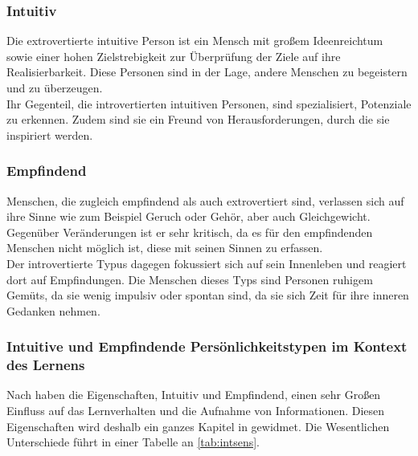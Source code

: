 \subsubsection{Intuitiv}
Die extrovertierte intuitive Person ist ein Mensch mit großem Ideenreichtum sowie einer hohen Zielstrebigkeit zur Überprüfung der Ziele auf ihre Realisierbarkeit. Diese Personen sind in der Lage, andere Menschen zu begeistern und zu überzeugen.\\
Ihr Gegenteil, die introvertierten intuitiven Personen, sind spezialisiert, Potenziale zu erkennen. Zudem sind sie ein Freund von Herausforderungen, durch die sie inspiriert werden.
\noindent
\cite{jung_2014}

\subsubsection{Empfindend}
Menschen, die zugleich empfindend als auch extrovertiert sind, verlassen sich auf ihre Sinne wie zum Beispiel Geruch oder Gehör, aber auch Gleichgewicht. Gegenüber Veränderungen ist er sehr kritisch, da es für den empfindenden Menschen nicht möglich ist, diese mit seinen Sinnen zu erfassen.\\
Der introvertierte Typus dagegen fokussiert sich auf sein Innenleben und reagiert dort auf Empfindungen. Die Menschen dieses Typs sind Personen ruhigem Gemüts, da sie wenig impulsiv oder spontan sind, da sie sich Zeit für ihre inneren Gedanken nehmen.
\noindent
\cite{jung_2014}

\subsubsection{Intuitive und Empfindende Persönlichkeitstypen im Kontext des Lernens}
Nach \citeauthor{mccaulley_myers-briggs_1974} haben die Eigenschaften, Intuitiv und Empfindend, einen sehr Großen Einfluss auf das Lernverhalten und die Aufnahme von Informationen. Diesen Eigenschaften wird deshalb ein ganzes Kapitel in  gewidmet. Die Wesentlichen Unterschiede führt \citeauthor{mccaulley_myers-briggs_1974} in einer Tabelle an \ref{tab:intsens}.

